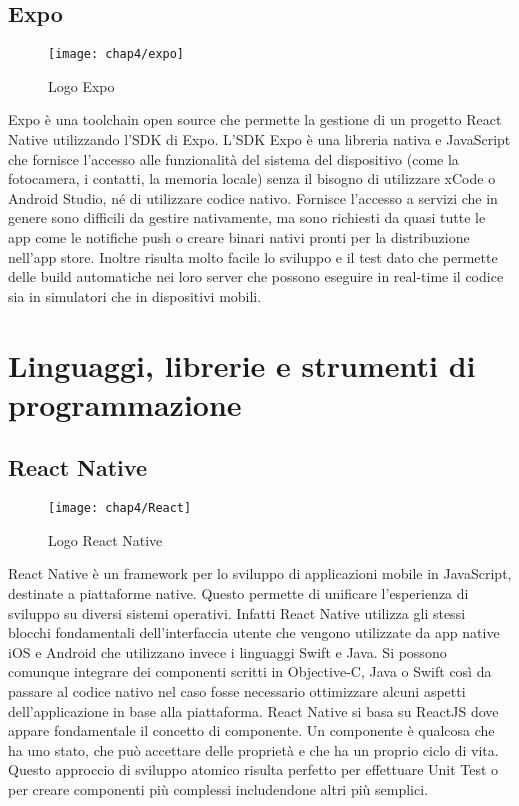 \subsection{Expo} \label{subsec:expo}
	\begin{figure}[H] 
		\centering
		\texttt{[image: chap4/expo]}
		\caption{Logo Expo}
	\end{figure}
Expo è una toolchain open source che permette la gestione di un progetto React 
Native utilizzando l'SDK di Expo. L'SDK Expo è una libreria nativa e JavaScript 
che fornisce l'accesso alle funzionalità del sistema del dispositivo (come la 
fotocamera, i contatti, la memoria locale) senza il bisogno di utilizzare xCode 
o Android Studio, né di utilizzare codice nativo. Fornisce l'accesso a servizi 
che in genere sono difficili da gestire nativamente, ma sono richiesti da quasi 
tutte le app come le notifiche push o creare binari nativi pronti per la 
distribuzione nell'app store.
Inoltre risulta molto facile lo sviluppo e il test dato che permette delle 
build automatiche nei loro server che possono eseguire in real-time il codice 
sia in simulatori che in dispositivi mobili.


\section{Linguaggi, librerie e strumenti di programmazione}

\subsection{React Native}
\begin{figure}[H] 
	\centering
	\texttt{[image: chap4/React]}
	\caption{Logo React Native}
\end{figure}
React Native è un framework per lo sviluppo di applicazioni mobile in
JavaScript, destinate a piattaforme native. Questo permette di 
unificare l'esperienza di sviluppo su diversi sistemi operativi. Infatti React 
Native utilizza gli stessi blocchi fondamentali dell'interfaccia utente che 
vengono utilizzate da app native iOS e Android che utilizzano invece i 
linguaggi Swift e Java.
Si possono comunque integrare dei componenti scritti in Objective-C, 
Java o Swift così da passare al codice nativo nel caso fosse necessario 
ottimizzare alcuni aspetti dell'applicazione in base alla piattaforma. 
React Native si basa su ReactJS dove appare fondamentale il concetto di 
componente. Un componente è qualcosa che ha uno stato, che può accettare 
delle proprietà e che ha un proprio ciclo di vita. Questo approccio di 
sviluppo atomico risulta perfetto per effettuare Unit Test o per creare 
componenti più complessi includendone altri più semplici.

